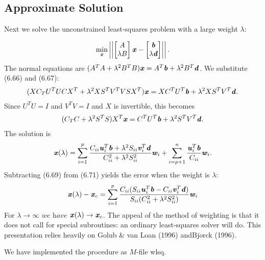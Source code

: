     \subsection{Approximate Solution}
    \begin{flushleft}
    	Next we solve the unconstrained least-squares problem with a large weight $ \lambda $:
    \end{flushleft}
\begin{align*}
\min_{\textbf{\textit{x}}} \left| \left| 
  \begin{bmatrix}
  A\\
  \lambda B
  \end{bmatrix} \textbf{\textit{x}} -
    \begin{bmatrix}
    \textbf{\textit{b}}\\
    \lambda \textbf{\textit{d}}
    \end{bmatrix}   \right| \right|   . 
\end{align*}
The normal equations are $(A^{T}A + \lambda ^{2} B^{T}B)\textbf{\textit{x}} = A^{T}\textbf{\textit{b}} + \lambda ^{2} B^{T} \textbf{\textit{d}} $. We substitute (6.66) and (6.67):
\begin{align*}
(XC_{T}U^{T}UCX^{T}+\lambda^{2}XS^{T}V^{T}VSX^{T})\textbf{\textit{x}}=XC^{T}U^{T}\textbf{\textit{b}}+\lambda^{2}XS^{T}V^{T}\textbf{\textit{d}}.
\end{align*}
Since $ U^{T}U=I$ and $ V^{T}V=I$ and $X$ is invertible, this becomes
\begin{align*}
(C_{T}C + \lambda^{2}S^{T}S )X^{T}\textbf{\textit{x}} =
C^{T}U^{T}\textbf{\textit{b}}+\lambda^{2}S^{T}V^{T}\textbf{\textit{d}}.
\end{align*}
The solution is
\begin{align}
\textbf{\textit{x}}(\lambda) =
\sum_{i=1}^p \dfrac{C_{ii}\textbf{\textit{u}}^{T}_{i}\textbf{\textit{b}} +
\lambda^{2} S_{ii} \textbf{\textit{v}}^{T}_{i}\textbf{\textit{d}}
}{C^{2}_{ii} + \lambda^{2}S^{2}_{ii}} \textbf{\textit{w}}_{i} +
\sum_{i=p+1}^n
\dfrac{\textbf{\textit{u}}^{T}_{i}\textbf{\textit{b}}}{C_{ii}}\textbf{\textit{w}}_{i}.
\end{align}
Subtracting (6.69) from (6.71) yields the error when the weight is $ \lambda$:
\begin{align}
\textbf{\textit{x}}(\lambda) - \textbf{\textit{x}}_{c} =
\sum_{i=1}^p \dfrac{C_{ii}( S_{ii}\textbf{\textit{u}}^{T}_{i}\textbf{\textit{b}}  - C_{ii}\textbf{\textit{v}}^{T}_{i}\textbf{\textit{d}} ) 
}{S_{ii} (C^{2}_{ii} + \lambda^{2}S^{2}_{ii})} \textbf{\textit{w}}_{i} 
\end{align}
For $ \lambda \rightarrow \infty$ $\textit{we have}$ $\textbf{\textit{x}}(\lambda) \rightarrow  \textbf{\textit{x}}_{c}$. The appeal of the method of weighting is that it does not call for special subroutines: an ordinary least-squares solver will do. This presentation relies heavily on Golub \& van Loan (1996) andBj$\ddot{o}$rck (1996).

    We have implemented the procedure as $M$-file wlsq.